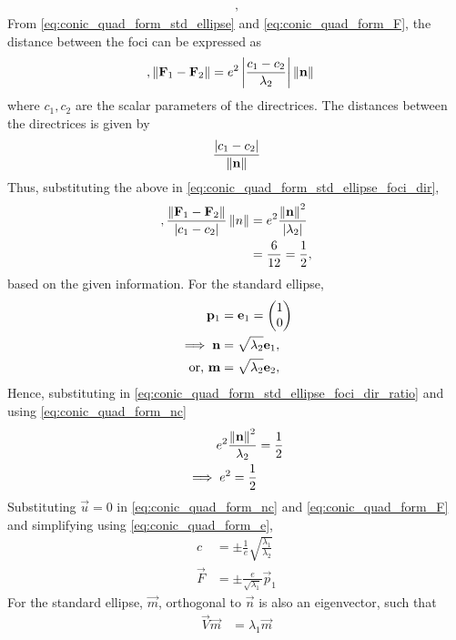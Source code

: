 \documentclass[journal,12pt,twocolumn]{IEEEtran}
\renewcommand\thesection{\arabic{section}}
\renewcommand\thesubsection{\thesection.\arabic{subsection}}
\begin{document}
\begin{enumerate}[label=\thesubsection.\arabic*.,ref=\thesubsection.\theenumi]
\begin{align}
  \label{eq:conic_quad_form_std_ellipse}, 
\end{align}
From 
  \eqref{eq:conic_quad_form_std_ellipse} and  
  \eqref{eq:conic_quad_form_F}, 
  the distance between the foci can be expressed as
\begin{align}
  \label{eq:conic_quad_form_std_ellipse_foci_dir}, 
	\left\lVert\mathbf{F}_1 - \mathbf{F}_2\right\rVert  &= e^2\left\vert\frac{c_1-c_2}{\lambda_2}\right\vert\left\lVert\mathbf{n}\right\rVert
\end{align}
%
where $c_1,c_2$ are the scalar parameters of the directrices.  The distances between the directrices is given by 
\begin{align}
	\frac{\left\vert c_1-c_2\right\vert}{\left\lVert\mathbf{n}\right\rVert}
\end{align}
Thus, substituting the above in 
  \eqref{eq:conic_quad_form_std_ellipse_foci_dir}, 
\begin{align}
  \label{eq:conic_quad_form_std_ellipse_foci_dir_ratio}, 
	\frac{\left\lVert\mathbf{F}_1 - \mathbf{F}_2\right\rVert}{\left\vert c_1-c_2\right\vert} \left\lVert n\right\rVert &= e^2\frac{\left\lVert\mathbf{n}\right\rVert^2}{\left\vert\lambda_2\right\vert}
	\\
	&=\frac{6}{12} = \frac{1}{2},
\end{align}
based on the given information.  For the standard ellipse, 
\begin{align}
	\mathbf{p}_1 &= \mathbf{e}_1 = \begin{pmatrix}1 \\ 0\end{pmatrix}
	\\
	\implies \mathbf{n} &= \sqrt{\lambda_2}\mathbf{e}_1,  
	\\
	\text{or, }\mathbf{m} &=\sqrt{\lambda_2}\mathbf{e}_2,   
\end{align}
Hence, substituting in 
  \eqref{eq:conic_quad_form_std_ellipse_foci_dir_ratio} and using  
\eqref{eq:conic_quad_form_nc} 
\begin{align}
	e^2\frac{\left\lVert\mathbf{n}\right\rVert^2}{\lambda_2} &= \frac{1}{2}
	\\
	\implies e^2 = \frac{1}{2}
\end{align}
Substituting $\vec{u} = 0$ in 
\eqref{eq:conic_quad_form_nc} and 
  \eqref{eq:conic_quad_form_F} 
  and simplifying using
  \eqref{eq:conic_quad_form_e},
\begin{align}
	c &= \pm \frac{1}{e}\sqrt{\frac{\lambda_1}{\lambda_2}}
	\\
	\vec{F} &= \pm \frac{e}{\sqrt{\lambda_1}}\vec{p}_1
\end{align}
For the standard ellipse, $\vec{m}$, orthogonal to $\vec{n}$ is also an eigenvector, such that 
\begin{align}
	\vec{V}\vec{m} &= {\lambda_1}\vec{m}  
	\\

\end{align}
\end{enumerate}
\end{document}

